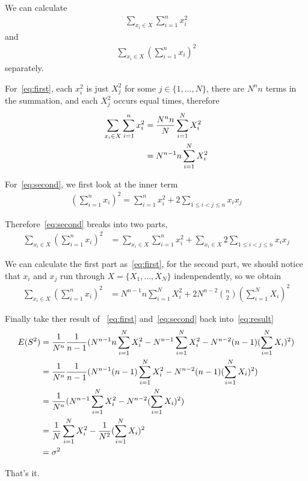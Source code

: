 \documentclass{article}
\begin{document}
We can calculate
\begin{align}
\label{eq:first}
\sum_{x_i \in X} \sum_{i=1}^n x_i^2
\end{align}
and
\begin{align}
\label{eq:second}
\sum_{x_i \in X} (\sum_{i=1}^n x_i)^2
\end{align}
separately.


For~\eqref{eq:first}, each $x_i^2$ is just $X_j^2$ for some $j \in \{1, \dots, N\}$,
there are $N^n n$ terms in the summation,
and each $X_j^2$ occurs equal times, therefore
\begin{align}
\sum_{x_i \in X} \sum_{i=1}^n x_i^2
 &= {N^n n \over N} \sum_{i=1}^N X_i^2	\nonumber\\
 &= N^{n-1} n \sum_{i=1}^N X_i^2
\end{align}


For~\eqref{eq:second}, we first look at the inner term
\begin{align}
(\sum_{i=1}^n x_i)^2 = \sum_{i=1}^n x_i^2
	+ 2 \sum_{1\leq i < j\leq n} x_i x_j
\end{align}

Therefore~\eqref{eq:second} breaks into two parts,
\begin{align}
\sum_{x_i \in X} (\sum_{i=1}^n x_i)^2
 &= \sum_{x_i \in X}
		\sum_{i=1}^n x_i^2
	+
	\sum_{x_i \in X}
		2\sum_{1\leq i < j\leq n} x_i x_j
\end{align}

We can calculate the first part as~\eqref{eq:first},
for the second part, we should notice that $x_i$ and $x_j$
run through $X = \{X_1, \dots, X_N\}$ indenpendently, so we obtain
\begin{align}
\sum_{x_i \in X} (\sum_{i=1}^n x_i)^2
 &= N^{n-1} n \sum_{i=1}^N X_i^2
	+
	2 N^{n-2} {n \choose 2} (\sum_{i=1}^N X_i)^2
\end{align}

Finally take ther result of ~\eqref{eq:first} and~\eqref{eq:second} back into~\eqref{eq:result}
\begin{align}
E(S^2)
 &= {1 \over N^n} {1 \over n - 1}
	(
		N^{n-1} n \sum_{i=1}^N X_i^2
		-
		N^{n-1} \sum_{i=1}^N X_i^2
		-
		N^{n-2} (n - 1) (\sum_{i=1}^N X_i)^2
	) \\
 &= {1 \over N^n} {1 \over n - 1}
	(
		N^{n-1} (n - 1) \sum_{i=1}^N X_i^2
		-
		N^{n-2} (n - 1) (\sum_{i=1}^N X_i)^2
	) \\
 &= {1 \over N^n}
	(
		N^{n-1} \sum_{i=1}^N X_i^2
		-
		N^{n-2} (\sum_{i=1}^N X_i)^2
	) \\
 &= {1 \over N} \sum_{i=1}^N X_i^2
	-
	{1 \over N^2} (\sum_{i=1}^N X_i)^2	\\
 &= \sigma^2
\end{align}

That's it.
\end{document}
